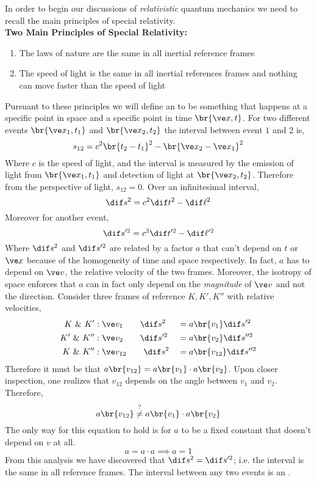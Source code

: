 \documentclass{article}
\begin{document}
In order to begin our discussions of \textit{relativistic} quantum mechanics we need to recall the main principles of special relativity. \\

\textbf{Two Main Principles of Special Relativity:} \\
\begin{enumerate}
    \item The laws of nature are the same in all inertial reference frames
    \item The speed of light is the same in all inertial references frames and nothing can move faster than the speed of light
\end{enumerate}

Pursuant to these principles we will define an  to be something that happens at a specific point in space and a specific point in time $\br{\ve x, t}$. For two different events $\br{\ve x_1, t_1}$ and $\br{\ve x_2, t_2}$ the interval between event $1$ and $2$ is,
\[ s_{12} = c^2 \br{t_2 - t_1}^2 - \br{\ve x_2 - \ve x_1}^2 \]
Where $c$ is the speed of light, and the interval is measured by the emission of light from $\br{\ve x_1, t_1}$ and detection of light at $\br{\ve x_2, t_2}$. Therefore from the perspective of light, $s_{12} = 0$. Over an infinitesimal interval,
\[ \dif s^2 = c^2 \dif t^2 - \dif \ell^2 \]
Moreover for another event,
\[ \dif s'^2 = c^2 \dif t'^2 - \dif \ell'^2 \]
Where $\dif s^2$ and $\dif s'^2$ are related by a factor $a$ that can't depend on $t$ or $\ve x$ because of the homogeneity of time and space respectively. In fact, $a$ has to depend on $\ve v$, the relative velocity of the two frames. Moreover, the isotropy of space enforces that $a$ can in fact only depend on the \textit{magnitude} of $\ve v$ and not the direction.  Consider three frames of reference $K, K', K''$ with relative velocities,
\begin{alignat*}{2}
    K \text{ \& } K' &: \ve v_1 \qquad \dif s^2 &&= a \br{v_1} \dif s'^2 \\
    K' \text{ \& } K'' &: \ve v_2 \qquad \dif s'^2 &&= a \br{v_2} \dif s''^2 \\
    K \text{ \& } K'' &: \ve v_{12}\qquad \dif s^2 &&= a \br{v_{12}} \dif s''^2
\end{alignat*}
Therefore it must be that $a\br{v_{12}} = a\br{v_1}\cdot a\br{v_2}$. Upon closer inspection, one realizes that $v_{12}$ depends on the angle between $v_1$ and $v_2$. Therefore,
\[ a\br{v_{12}} \stackrel{?}{\neq} a\br{v_1}\cdot a\br{v_2} \]
The only way for this equation to hold is for $a$ to be a fixed constant that doesn't depend on $v$ at all.
\[ a = a\cdot a \implies a = 1 \]
From this analysis we have discovered that $\dif s^2 = \dif s'^2$; i.e. the interval is the same in all reference frames. The interval between any two events is an .
\end{document}

